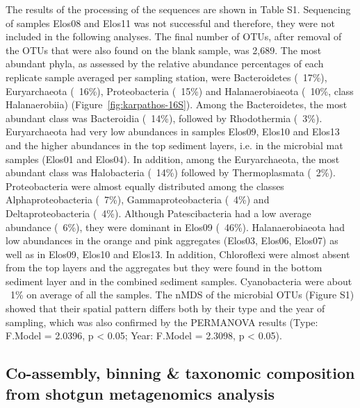    The results of the processing of the sequences are shown in Table S1. 
   Sequencing of samples Elos08 and Elos11 was not successful and therefore, they were not included in the following analyses. 
   The final number of OTUs, after removal of the OTUs that were also found on the blank sample, was 2,689. 
   The most abundant phyla, as assessed by the relative abundance percentages of each replicate sample averaged per sampling station, were Bacteroidetes (~17\%), 
   Euryarchaeota (~16\%), Proteobacteria (~15\%) and Halanaerobiaeota (~10\%, class Halanaerobiia) (Figure~\ref{fig:karpathos-16S}). 
   Among the Bacteroidetes, the most abundant class was Bacteroidia (~14\%), followed by Rhodothermia (~3\%). 
   Euryarchaeota had very low abundances in samples Elos09, Elos10 and Elos13 and the higher abundances in the top sediment layers, i.e. in the microbial mat samples (Elos01 and Elos04). 
   In addition, among the Euryarchaeota, the most abundant class was Halobacteria (~14\%) followed by Thermoplasmata (~2\%). 
   Proteobacteria were almost equally distributed among the classes Alphaproteobacteria (~7\%), Gammaproteobacteria (~4\%) and Deltaproteobacteria (~4\%). 
   Although Patescibacteria had a low average abundance (~6\%), they were dominant in Elos09 (~46\%). 
   Halanaerobiaeota had low abundances in the orange and pink aggregates (Elos03, Elos06, Elos07) as well as in Elos09, Elos10 and Elos13. 
   In addition, Chloroflexi were almost absent from the top layers and the aggregates but they were found in the bottom sediment layer and in the combined sediment samples. 
   Cyanobacteria were about ~1\% on average of all the samples. 
   The nMDS of the microbial OTUs (Figure S1) showed that their spatial pattern differs both by their type and the year of sampling, which was also confirmed by the PERMANOVA results (Type: F.Model = 2.0396, p < 0.05; Year: F.Model = 2.3098, p < 0.05).


\subsection{Co-assembly, binning \& taxonomic composition from shotgun metagenomics analysis}

